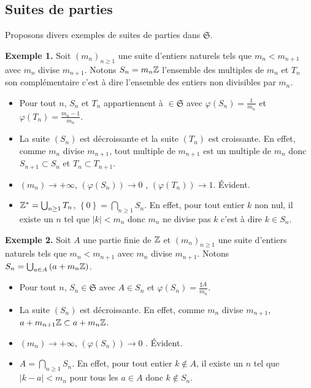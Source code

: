 \subsection{Suites de parties}\label{ExplesSuitesCongru}
Proposons divers exemples de suites de parties dans $\mathfrak{S}$.

\textbf{Exemple 1.}\newline
Soit  $(m_n)_{n\geq 1}$ une suite d'entiers naturels tels que $m_n < m_{n+1}$ avec $m_n$ divise $m_{n+1}$.\newline
Notons $S_n = m_n \mathbb{Z}$ l'ensemble des multiples de $m_n$ et $T_n$ son complémentaire c'est à dire l'ensemble des entiers non divisibles par $m_n$.
 \begin{itemize}
  \item Pour tout $n$, $S_n$ et $T_n$ appartiennent à $\in \mathfrak{S}$ avec $\varphi(S_n)=\frac{1}{m_n}$ et $\varphi(T_n)=\frac{m_n-1}{m_n}$.
  \item La suite $(S_n)$ est décroissante et la suite $(T_n)$ est croissante. En effet, comme $m_n$ divise $m_{n+1}$, tout multiple de $m_{n+1}$ est un multiple de $m_{n}$ donc $S_{n+1} \subset S_{n}$ et $T_n \subset T_{n+1}$.
  \item $(m_n) \rightarrow + \infty$, $(\varphi(S_n)) \rightarrow 0$ , $(\varphi(T_n)) \rightarrow 1$. Évident.
  \item $\mathbb{Z}^* = \bigcup_{n\geq 1} T_n$, $\left\lbrace 0 \right\rbrace = \bigcap_{n\geq 1} S_n$. En effet, pour tout entier $k$ non nul, il existe un $n$ tel que $|k| < m_n$ donc $m_n$ ne divise pas $k$ c'est à dire $k \in S_n$.
 \end{itemize}

\textbf{Exemple 2.}\newline
Soit  $A$ une partie finie de $\mathbb{Z}$ et $(m_n)_{n\geq 1}$ une suite d'entiers naturels tels que $m_n < m_{n+1}$ avec $m_n$ divise $m_{n+1}$.\newline
Notons $S_n = \bigcup_{a \in A} \left(a + m_n \mathbb{Z}\right)$.
 \begin{itemize}
  \item Pour tout $n$, $S_n\in \mathfrak{S}$ avec $A \in S_n$ et $\varphi(S_n)=\frac{\sharp A }{m_n}$.
  \item La suite $(S_n)$ est décroissante. En effet, comme $m_n$ divise $m_{n+1}$, $a + m_{n+1}\mathbb{Z} \subset a + m_{n}\mathbb{Z}$.
  \item $(m_n) \rightarrow + \infty$, $(\varphi(S_n)) \rightarrow 0$ . Évident.
  \item $A = \bigcap_{n\geq 1} S_n$. En effet, pour tout entier $k \notin A$, il existe un $n$ tel que $|k -a| < m_n$ pour tous les $a\in A$ donc $k \notin S_n$.
 \end{itemize}


